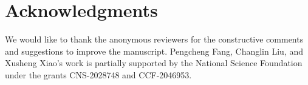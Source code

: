 \section*{Acknowledgments}
\label{sec:acknowledgments}

We would like to thank the anonymous reviewers for the constructive comments and suggestions to improve the manuscript.
Pengcheng Fang, Changlin Liu, and Xusheng Xiao's work is partially supported by the National Science Foundation under the grants CNS-2028748 and CCF-2046953.